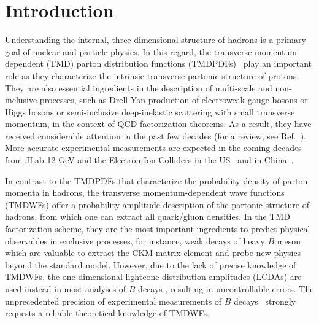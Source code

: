 \documentclass[prd,aps,twocolumn,preprintnumbers, showpacs, nofootinbib,superscriptaddress,notitlepage]{revtex4-1}
\newcommand\bl{\color{blue}}
\begin{document}
\maketitle
\section{Introduction}

Understanding the internal, {\bl three-dimensional structure of hadrons is} a primary goal of nuclear and particle physics. In this regard, the transverse momentum-dependent (TMD) parton distribution functions (TMDPDFs)~\cite{Collins:1981uk,Collins:1981va} play an important role as they characterize the intrinsic transverse 
partonic structure of protons. They are also essential ingredients in the description of multi-scale and non-inclusive processes, such as Drell-Yan production of electroweak gauge bosons or Higgs bosons or semi-inclusive deep-inelastic scattering with small transverse momentum, in the context of QCD factorization theorems. As a result, they have received considerable attention in the past few decades (for a review, see Ref.~\cite{Angeles-Martinez:2015sea}). More accurate experimental measurements are expected in the coming decades from JLab 12 GeV and the Electron-Ion {\bl Colliders} in the US~\cite{Accardi:2012qut,AbdulKhalek:2021gbh} and in China~\cite{Anderle:2021wcy}.


In contrast to the TMDPDFs that characterize the probability density of parton momenta in hadrons, the transverse momentum-dependent wave functions (TMDWFs) offer a probability amplitude description of the partonic structure of hadrons, from which one can extract all quark/gluon densities. In {\bl the} TMD factorization scheme, they are the most important ingredients to predict physical observables in exclusive processes, for instance, weak decays of heavy $B$ meson~\cite{Keum:2000wi,Lu:2000em} which are valuable to extract the CKM matrix element and probe new physics beyond the standard model. However, due to the lack of precise knowledge of TMDWFs, the one-dimensional lightcone distribution amplitudes (LCDAs) are used instead in most analyses of $B$ decays \cite{Keum:2000wi,Lu:2000em,Nagashima:2002ia}, resulting in uncontrollable errors.  The unprecedented  precision of experimental measurements  of $B$ decays~\cite{Cerri:2018ypt} strongly requests a reliable theoretical  knowledge of TMDWFs. 
\end{document}
